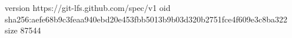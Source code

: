 version https://git-lfs.github.com/spec/v1
oid sha256:aefe68b9c3feaa940ebd20e453fbb5013b9b03d320b2751fce4f609e3c8ba322
size 87544
